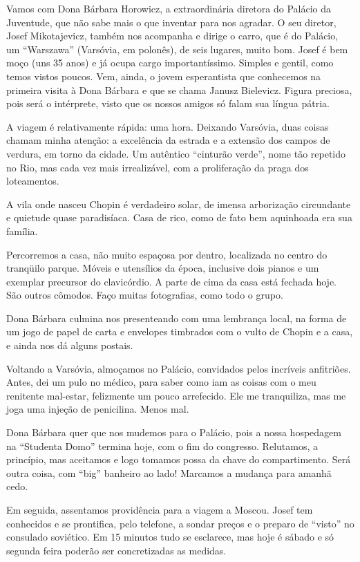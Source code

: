 Vamos com Dona Bárbara Horowicz, a extraordinária diretora do Palácio da Juventude, que não sabe mais o que inventar para nos agradar. O seu diretor, Josef Mikotajevicz, também nos acompanha e dirige o carro, que é do Palácio, um ``Warszawa'' (Varsóvia, em polonês), de seis lugares, muito bom. Josef é bem moço (uns 35 anos) e já ocupa cargo importantíssimo. Simples e gentil, como temos vistos poucos. Vem, ainda, o jovem esperantista que conhecemos na primeira visita à Dona Bárbara e que se chama Janusz Bielevicz. Figura preciosa, pois será o intérprete, visto que os nossos amigos só falam sua língua pátria.

A viagem é relativamente rápida: uma hora. Deixando Varsóvia, duas coisas chamam minha atenção: a excelência da estrada e a extensão dos campos de verdura, em torno da cidade. Um autêntico ``cinturão verde'', nome tão repetido no Rio, mas cada vez mais irrealizável, com a proliferação da praga dos loteamentos.

A vila onde nasceu Chopin é verdadeiro solar, de imensa arborização circundante e quietude quase paradisíaca. Casa de rico, como de fato bem aquinhoada era sua família.

Percorremos a casa, não muito espaçosa por dentro, localizada no centro do tranqüilo parque. Móveis e utensílios da época, inclusive dois pianos e um exemplar precursor do clavicórdio. A parte de cima da casa está fechada hoje. São outros cômodos. Faço muitas fotografias, como todo o grupo.

Dona Bárbara culmina nos presenteando com uma lembrança local, na forma de um jogo de papel de carta e envelopes timbrados com o vulto de Chopin e a casa, e ainda nos dá alguns postais.

Voltando a Varsóvia, almoçamos no Palácio, convidados pelos incríveis anfitriões. Antes, dei um pulo no médico, para saber como iam as coisas com o meu renitente mal-estar, felizmente um pouco arrefecido. Ele me tranquiliza, mas me joga uma injeção de penicilina. Menos mal.

Dona Bárbara quer que nos mudemos para o Palácio, pois a nossa hospedagem na ``Studenta Domo'' termina hoje, com o fim do congresso. Relutamos, a princípio, mas aceitamos e logo tomamos possa da chave do compartimento. Será outra coisa, com ``big'' banheiro ao lado! Marcamos a mudança para amanhã cedo.

Em seguida, assentamos providência para a viagem a Moscou. Josef tem conhecidos e se prontifica, pelo telefone, a sondar preços e o preparo de ``visto'' no consulado soviético. Em 15 minutos tudo se esclarece, mas hoje é sábado e só segunda feira poderão ser concretizadas as medidas.

